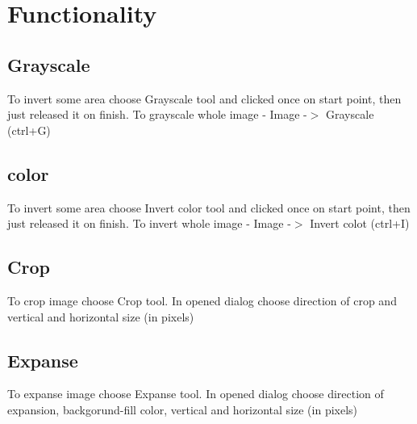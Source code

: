 \hypertarget{index_Functionality}{}\section{Functionality}\label{index_Functionality}
\hypertarget{index_Grayscale}{}\subsection{Grayscale}\label{index_Grayscale}
To invert some area choose Grayscale tool and clicked once on start point, then just released it on finish. To grayscale whole image -\/ Image -\/$>$ Grayscale (ctrl+G)\hypertarget{index_Invert}{}\subsection{color}\label{index_Invert}
To invert some area choose Invert color tool and clicked once on start point, then just released it on finish. To invert whole image -\/ Image -\/$>$ Invert colot (ctrl+I)\hypertarget{index_Crop}{}\subsection{Crop}\label{index_Crop}
To crop image choose Crop tool. In opened dialog choose direction of crop and vertical and horizontal size (in pixels)\hypertarget{index_Expanse}{}\subsection{Expanse}\label{index_Expanse}
To expanse image choose Expanse tool. In opened dialog choose direction of expansion, backgorund-\/fill color, vertical and horizontal size (in pixels) 